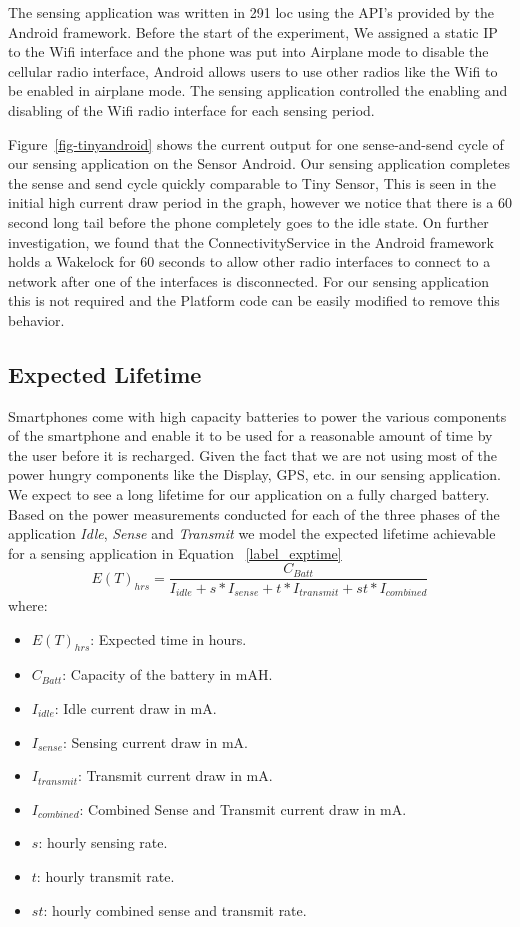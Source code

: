 The sensing application was written in 291 loc using the API's provided by the Android framework. 
Before the start of the experiment, We assigned a static IP to the Wifi interface and the phone was put into Airplane mode to 
disable the cellular radio interface, Android allows users to use other radios like the Wifi to be enabled in airplane mode.
The sensing application controlled the enabling and disabling of the Wifi radio interface for each sensing period.

Figure~\ref{fig-tinyandroid} shows the current output for one sense-and-send cycle of our 
sensing application on the Sensor Android. Our sensing application completes the sense and 
send cycle quickly comparable to Tiny Sensor, This is seen in the initial high current draw period 
in the graph, however we notice that there is a 60 second long tail before
the phone completely goes to the idle state. On further investigation, we found that the 
ConnectivityService in the Android framework holds a Wakelock for 60 seconds to allow other 
radio interfaces to connect  to a network after one of the interfaces is disconnected. 
For our sensing application this is not required and the Platform code can be easily modified to remove this behavior.

\subsection{Expected Lifetime}
Smartphones come with high capacity batteries to power the various components of the smartphone and enable it to be used for a reasonable amount of time by the user before it is recharged. Given the fact that we are not using most of the power hungry components like the Display, GPS, etc. in our sensing application. We expect to see a long lifetime for our application on a fully charged battery. Based on the power measurements conducted for each of the three phases of the application \textit{Idle}, \textit{Sense} and \textit{Transmit} we model the expected lifetime achievable for a sensing application in Equation ~\ref{label_exptime} 
\begin{equation}\label{label_exptime}
    E(T)_{hrs} = \frac{C_{Batt}}{I_{idle} + s*I_{sense} + t*I_{transmit} + st*I_{combined}}
\end{equation}
where:
{\small
\begin{itemize}[label=]
    \item $E(T)_{hrs}$: Expected time in hours.
    \item $C_{Batt}$: Capacity of the battery in mAH.
    \item $I_{idle}$: Idle current draw in mA.
    \item $I_{sense}$: Sensing current draw in mA.
    \item $I_{transmit}$: Transmit current draw in mA.
    \item $I_{combined}$: Combined Sense and Transmit current draw in mA.
    \item $s$: hourly sensing rate.
    \item $t$: hourly transmit rate.
    \item $st$: hourly combined sense and transmit rate.
\end{itemize}
}

